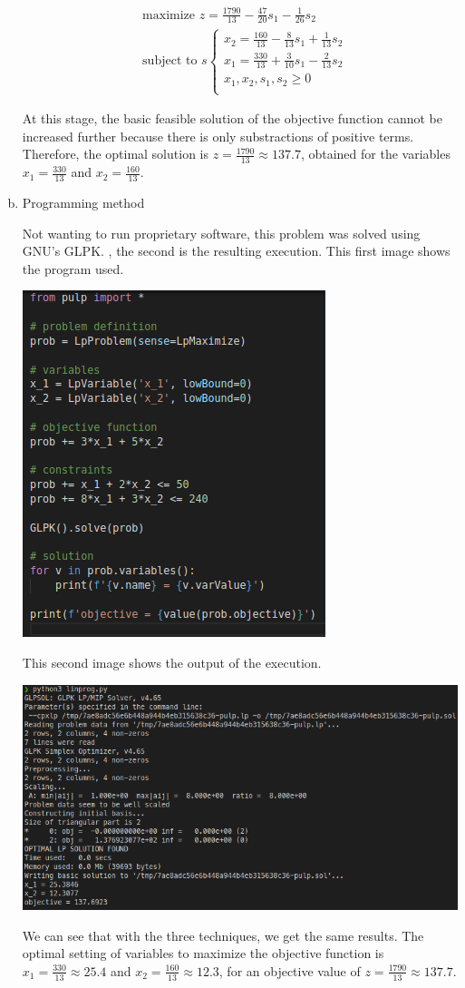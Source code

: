 \documentclass[a4paper, 10pt, twoside]{article}
\begin{document}
\begin{enumerate}[a)]
          \begin{align*}
               & \text{maximize } z = \frac{1790}{13} - \frac{47}{20}s_1 - \frac{1}{26}s_2 \\
               & \text{subject to }s
              \begin{cases}
                  x_2 = \frac{160}{13}-\frac{8}{13}s_1+\frac{1}{13}s_2 \\
                  x_1=\frac{330}{13}+\frac{3}{10}s_1-\frac{2}{13}s_2   \\
                  x_1, x_2, s_1, s_2 \ge 0                             \\
              \end{cases}
          \end{align*}

          At this stage, the basic feasible solution of the objective function cannot be increased further because there is only substractions of positive terms. Therefore, the optimal solution is $z = \frac{1790}{13} \approx 137.7$, obtained for the variables $x_1 = \frac{330}{13}$ and $x_2 = \frac{160}{13}$.

    \item Programming method

          Not wanting to run proprietary software, this problem was solved using GNU's GLPK. , the second is the resulting execution.
          This first image shows the program used.
          \begin{center}
              \includegraphics[width = .5 \textwidth]{linprog_script.png}
          \end{center}
          This second image shows the output of the execution.
          \begin{center}
            \includegraphics[width = .5 \textwidth]{linprog_run.png}
          \end{center}

    We can see that with the three techniques, we get the same results. The optimal setting of variables to maximize the objective function is $x_1 = \frac{330}{13} \approx 25.4$ and $x_2 = \frac{160}{13} \approx 12.3$, for an objective value of $z = \frac{1790}{13} \approx 137.7.$
\end{enumerate}
\end{document}
